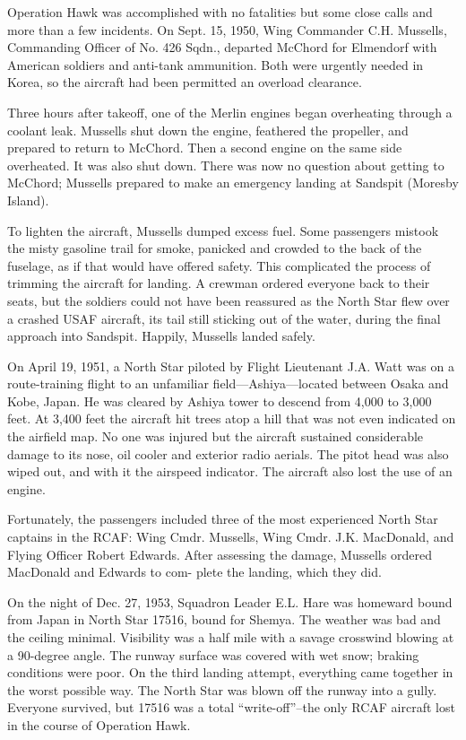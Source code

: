 Operation Hawk was accomplished with no fatalities but some close
calls and more than a few incidents. On Sept. 15, 1950, Wing Commander
C.H. Mussells, Commanding Officer of No. 426 Sqdn., departed McChord
for Elmendorf with American soldiers and anti-tank ammunition. Both
were urgently needed in Korea, so the aircraft had been permitted an
overload clearance.

Three hours after takeoff, one of the Merlin engines began overheating
through a coolant leak. Mussells shut down the engine, feathered the
propeller, and prepared to return to McChord. Then a second engine on
the same side overheated. It was also shut down. There was now no
question about getting to McChord; Mussells prepared to make an
emergency landing at Sandspit (Moresby Island).

To lighten the aircraft, Mussells dumped excess fuel. Some passengers
mistook the misty gasoline trail for smoke, panicked and crowded to
the back of the fuselage, as if that would have offered safety. This
complicated the process of trimming the aircraft for landing. A
crewman ordered everyone back to their seats, but the soldiers could
not have been reassured as the North Star flew over a crashed USAF
aircraft, its tail still sticking out of the water, during the final
approach into Sandspit. Happily, Mussells landed safely.

On April 19, 1951, a North Star piloted by Flight Lieutenant J.A. Watt
was on a route-training flight to an unfamiliar field—Ashiya—located
between Osaka and Kobe, Japan. He was cleared by Ashiya tower to
descend from 4,000 to 3,000 feet. At 3,400 feet the aircraft hit trees
atop a hill that was not even indicated on the airfield map. No one
was injured but the aircraft sustained considerable damage to its
nose, oil cooler and exterior radio aerials. The pitot head was also
wiped out, and with it the airspeed indicator. The aircraft also lost
the use of an engine.

Fortunately, the passengers included three of the most experienced
North Star captains in the RCAF: Wing Cmdr. Mussells, Wing
Cmdr. J.K. MacDonald, and Flying Officer Robert Edwards. After
assessing the damage, Mussells ordered MacDonald and Edwards to com-
plete the landing, which they did.

On the night of Dec. 27, 1953, Squadron Leader E.L. Hare was homeward
bound from Japan in North Star 17516, bound for Shemya. The weather
was bad and the ceiling minimal. Visibility was a half mile with a
savage crosswind blowing at a 90-degree angle. The runway surface was
covered with wet snow; braking conditions were poor. On the third
landing attempt, everything came together in the worst possible
way. The North Star was blown off the runway into a gully. Everyone
survived, but 17516 was a total “write-off”–the only RCAF aircraft
lost in the course of Operation Hawk.

